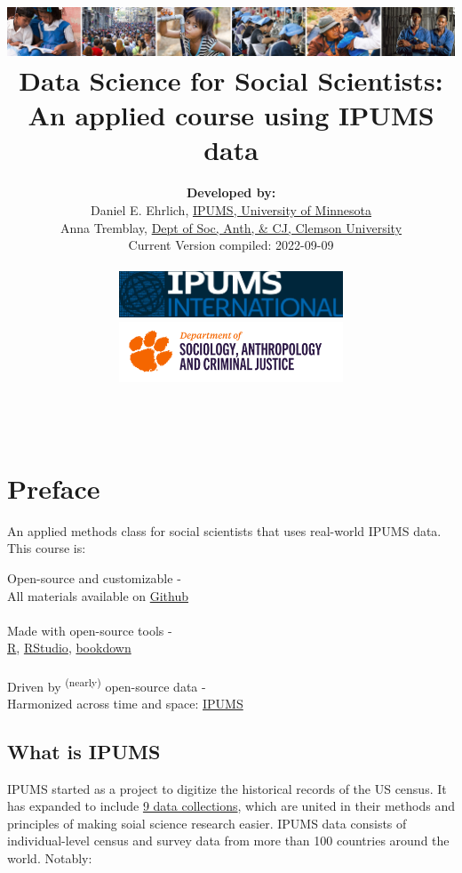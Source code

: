 \documentclass[
]{book}
\title{\includegraphics{ipums_banner.png}\\
Data Science for Social Scientists:\\
An applied course using IPUMS data}
\author{\textbf{Developed by:}\\
\hspace*{0.333em}\hspace*{0.333em}Daniel E. Ehrlich, \href{https://international.ipums.org/international/}{IPUMS, University of Minnesota}\\
\hspace*{0.333em}\hspace*{0.333em}Anna Tremblay, \href{https://www.clemson.edu/cbshs/departments/sacj/degrees/anthropology.html}{Dept of Soc, Anth, \& CJ, Clemson University}\\
\hspace*{0.333em}\hspace*{0.333em}Current Version compiled: 2022-09-09\\
~\\
\includegraphics[width=0.5\textwidth,height=\textheight]{ipums_i_logo.jpg}\\
\includegraphics[width=0.5\textwidth,height=\textheight]{clemson_logo.png}\\
~\\
~\\}
\date{}
\begin{document}
\maketitle

{
\setcounter{tocdepth}{1}
\tableofcontents
}
\hypertarget{preface}{%
\chapter*{Preface}\label{preface}}

An applied methods class for social scientists that uses real-world IPUMS data. This course is:

Open-source and customizable -\\
\hspace*{0.333em}\hspace*{0.333em}\hspace*{0.333em}All materials available on \href{https://github.com/ehrlichd/stats_book}{Github}\\
~\\
Made with open-source tools -\\
\hspace*{0.333em}\hspace*{0.333em}\href{https://cran.r-project.org/}{R}, \href{https://www.rstudio.com/products/rstudio/}{RStudio}, \href{https://bookdown.org/}{bookdown}\\
~\\
Driven by \textsuperscript{(nearly)} open-source data -\\
\hspace*{0.333em}\hspace*{0.333em}Harmonized across time and space: \href{https://ipums.org}{IPUMS}\\

\hypertarget{what-is-ipums}{%
\section*{What is IPUMS}\label{what-is-ipums}}

IPUMS started as a project to digitize the historical records of the US census. It has expanded to include \href{https://www.ipums.org/}{9 data collections}, which are united in their methods and principles of making soial science research easier. IPUMS data consists of individual-level census and survey data from more than 100 countries around the world. Notably:
\end{document}
